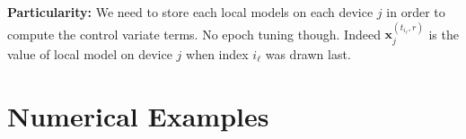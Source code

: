 \documentclass[11pt]{article}
\theoremstyle{t}
\begin{document}
\textbf{Particularity:}  We need to store each local models on each device $j$ in order to compute the control variate terms. No epoch tuning though.
Indeed $ \boldsymbol{x}_j^{(t_{i_\ell},r)}$ is the value of local model on device $j$ when index $i_\ell$ was drawn last.


\section{Numerical Examples}

\newpage






\end{document}
